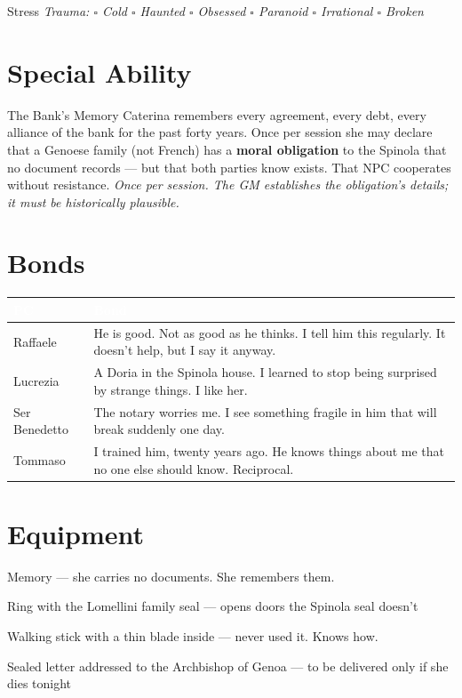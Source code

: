 \medskip
\begin{pgclockbox}{Stress \hfill {}}
\small\textit{Trauma: $\square$ Cold \quad $\square$ Haunted \quad $\square$ Obsessed \quad $\square$ Paranoid \quad $\square$ Irrational \quad $\square$ Broken}
\end{pgclockbox}

\section*{Special Ability}
\begin{spinolabox}{The Bank's Memory}
Caterina remembers every agreement, every debt, every alliance of the bank for the
past forty years. Once per session she may declare that a Genoese family (not French)
has a \textbf{moral obligation} to the Spinola that no document records --- but that
both parties know exists. That NPC cooperates without resistance.
\textit{Once per session. The GM establishes the obligation's details; it must be historically plausible.}
\end{spinolabox}

\section*{Bonds}
\begin{table}[h]\centering\renewcommand{\arraystretch}{1.4}
\begin{tabularx}{\linewidth}{@{}L{2.6cm} X@{}}
\toprule{}
\textcolor{white}{\textbf{PC}} & \textcolor{white}{\textbf{Bond}} \\
\midrule
Raffaele & He is good. Not as good as he thinks. I tell him this regularly. It doesn't help, but I say it anyway. \\
Lucrezia & A Doria in the Spinola house. I learned to stop being surprised by strange things. I like her. \\
Ser Benedetto & The notary worries me. I see something fragile in him that will break suddenly one day. \\
Tommaso & I trained him, twenty years ago. He knows things about me that no one else should know. Reciprocal. \\
\bottomrule
\end{tabularx}
\end{table}

\section*{Equipment}
\begin{goldlist}
\item Memory --- she carries no documents. She remembers them.
\item Ring with the Lomellini family seal --- opens doors the Spinola seal doesn't
\item Walking stick with a thin blade inside --- never used it. Knows how.
\item Sealed letter addressed to the Archbishop of Genoa --- to be delivered only if she dies tonight
\end{goldlist}

